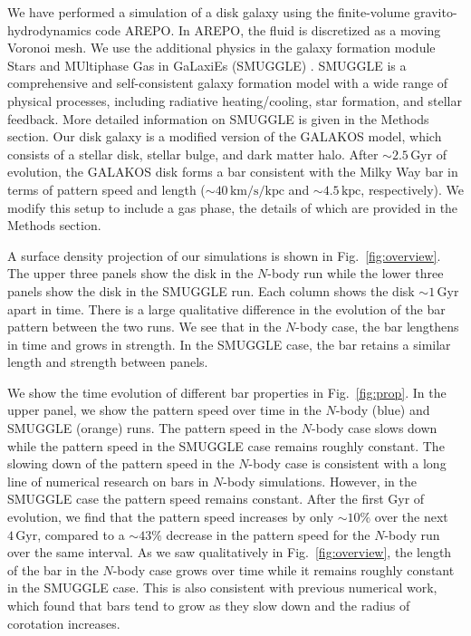 \documentclass{natureprintstyle}
\newcommand{\Nbody}{$N$-body}
\begin{document}
We have performed a simulation of a disk galaxy using the finite-volume
gravito-hydrodynamics code AREPO.\cite{2010MNRAS.401..791S} In AREPO, the
fluid is discretized as a moving Voronoi mesh. We use the additional physics
in the galaxy formation module Stars and MUltiphase Gas in GaLaxiEs (SMUGGLE)
\cite{2019MNRAS.489.4233M}. SMUGGLE is a comprehensive and self-consistent
galaxy formation model with a wide range of physical processes, including
radiative heating/cooling, star formation, and stellar feedback. More detailed
information on SMUGGLE is given in the Methods section. Our disk galaxy is a
modified version of the GALAKOS model\cite{2020ApJ...890..117D}, which
consists of a stellar disk, stellar bulge, and dark matter halo. After
$\sim2.5\,\textrm{Gyr}$ of evolution, the GALAKOS disk forms a bar consistent
with the Milky Way bar in terms of pattern speed and length
($\sim40\,\textrm{km}/\textrm{s}/\textrm{kpc}$ and $\sim4.5\,\textrm{kpc}$,
respectively). We modify this setup to include a gas phase, the details of
which are provided in the Methods section.

A surface density projection of our simulations is shown in
Fig.~\ref{fig:overview}. The upper three panels show the disk in the \Nbody{}
run while the lower three panels show the disk in the SMUGGLE run. Each column
shows the disk $\sim1\,\textrm{Gyr}$ apart in time. There is a large
qualitative difference in the evolution of the bar pattern between the two
runs. We see that in the \Nbody{} case, the bar lengthens in time and grows in
strength. In the SMUGGLE case, the bar retains a similar length and strength
between panels.

We show the time evolution of different bar properties in Fig.~\ref{fig:prop}.
In the upper panel, we show the pattern speed over time in the \Nbody{} (blue)
and SMUGGLE (orange) runs. The pattern speed in the \Nbody{} case slows down
while the pattern speed in the SMUGGLE case remains roughly constant. The
slowing down of the pattern speed in the \Nbody{} case is consistent with a long
line of numerical research on bars in \Nbody{}
simulations.\cite{1992ApJ...400...80H, 2000ApJ...543..704D,
2002MNRAS.330...35A, 2002ApJ...569L..83A, 2003MNRAS.341.1179A,
2003MNRAS.346..251O, 2005MNRAS.363..991H, 2006ApJ...637..214M,
2007MNRAS.375..460W, 2009ApJ...697..293D} However, in the SMUGGLE case the
pattern speed remains constant. After the first Gyr of evolution, we find that
the pattern speed increases by only $\sim10\%$ over the next
$4\,\textrm{Gyr}$, compared to a $\sim43\%$ decrease in the pattern speed for
the \Nbody{} run over the same interval. As we saw qualitatively in
Fig.~\ref{fig:overview}, the length of the bar in the \Nbody{} case grows over
time while it remains roughly constant in the SMUGGLE case. This is also
consistent with previous numerical work, which found that bars tend to grow as
they slow down and the radius of corotation
increases.\cite{2000ApJ...543..704D, 2003MNRAS.341.1179A}
\end{document}
